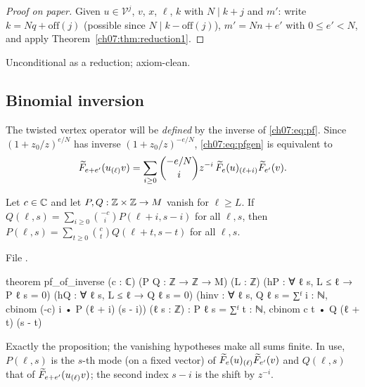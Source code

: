 \begin{proof}[Proof on paper]
Given $u\in\mathcal V^j$, $v$, $x$, $\ell$, $k$ with $N\mid k+j$ and $m'$: write
$k = Nq+\mathrm{off}(j)$ (possible since $N\mid k-\mathrm{off}(j)$), $m' = Nn+e'$ with
$0\le e'<N$, and apply Theorem~\ref{ch07:thm:reduction1}.
\end{proof}

\begin{status}
Unconditional as a reduction; axiom-clean.
\end{status}

\subsection{Binomial inversion}

The twisted vertex operator will be \emph{defined} by the inverse of \eqref{ch07:eq:pf}. Since
$(1+z_0/z)^{e/N}$ has inverse $(1+z_0/z)^{-e/N}$, \eqref{ch07:eq:pfgen} is equivalent to
\begin{equation}\label{ch07:eq:pfinv}
  \widetilde{F}_{e+e'}(u_{(\ell)}v) = \sum_{i\ge0}\binom{-e/N}{i}z^{-i}\,
  \widetilde{F}_e(u)_{(\ell+i)}\widetilde{F}_{e'}(v).
\end{equation}

\begin{proposition}\label{ch07:prop:inverse}
Let $c\in{\mathbb{C}}$ and let $P,Q:{\mathbb{Z}}\times{\mathbb{Z}}\to M$ vanish for $\ell\ge L$. If $Q(\ell,s) = \sum_{i\ge0}
\binom{-c}{i}P(\ell+i,s-i)$ for all $\ell,s$, then $P(\ell,s) = \sum_{t\ge0}\binom ct
Q(\ell+t,s-t)$ for all $\ell, s$.
\end{proposition}

\noindent File .
\begin{leancode}
theorem pf_of_inverse (c : ℂ) (P Q : ℤ → ℤ → M) (L : ℤ)
    (hP : ∀ ℓ s, L ≤ ℓ → P ℓ s = 0) (hQ : ∀ ℓ s, L ≤ ℓ → Q ℓ s = 0)
    (hinv : ∀ ℓ s, Q ℓ s = ∑ᶠ i : ℕ, cbinom (-c) i • P (ℓ + i) (s - i)) (ℓ s : ℤ) :
    P ℓ s = ∑ᶠ t : ℕ, cbinom c t • Q (ℓ + t) (s - t)
\end{leancode}

\begin{dictionary}
Exactly the proposition; the vanishing hypotheses make all sums finite. In use, $P(\ell,s)$ is
the $s$-th mode (on a fixed vector) of $\widetilde{F}_e(u)_{(\ell)}\widetilde{F}_{e'}(v)$ and
$Q(\ell,s)$ that of $\widetilde{F}_{e+e'}(u_{(\ell)}v)$; the second index $s-i$ is the shift by
$z^{-i}$.
\end{dictionary}

